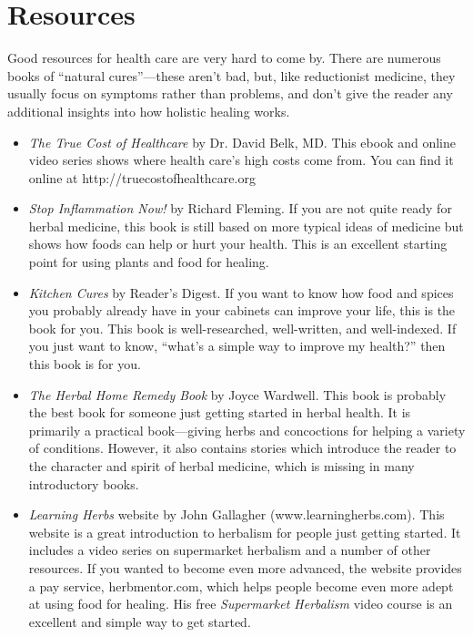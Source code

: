 \section{Resources}

Good resources for health care are very hard to come by.  There are numerous
books of ``natural cures''---these aren't bad, but, like reductionist medicine, 
they usually focus on symptoms rather than problems, and don't give the 
reader any additional insights into how holistic healing works.

\begin{itemize}
\item 
\textit{The True Cost of Healthcare} by Dr. David Belk, MD.  This ebook and online
video series shows where health care's high costs come from.  You can find it online
at http://truecostofhealthcare.org
\item 
\textit{Stop Inflammation Now!} by Richard Fleming. If you are not quite
ready for herbal medicine, this book is still based on more typical
ideas of medicine but shows how foods can help or hurt your health.
This is an excellent starting point for using plants and food for
healing.
\item
\textit{Kitchen Cures} by Reader's Digest.  If you want to know how food and spices
you probably already have in your cabinets can improve your life, this is the book
for you.  This book is well-researched, well-written, and well-indexed.  If you 
just want to know, ``what's a simple way to improve my health?'' then this book
is for you.
\item 
\textit{The Herbal Home Remedy Book} by Joyce Wardwell. This book is
probably the best book for someone just getting started in herbal
health. It is primarily a practical book—giving herbs and concoctions
for helping a variety of conditions. However, it also contains stories
which introduce the reader to the character and spirit of herbal
medicine, which is missing in many introductory books.
\item 
\textit{Learning Herbs} website by John Gallagher
(www.learningherbs.com). This website is a great introduction to
herbalism for people just getting started. It includes a video series
on supermarket herbalism and a number of other resources. If you wanted
to become even more advanced, the website provides a pay service,
herbmentor.com, which helps people become even more adept at using food
for healing.  His free \textit{Supermarket Herbalism} video course is
an excellent and simple way to get started.
\end{itemize}

